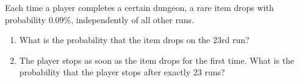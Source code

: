Each time a player completes a certain dungeon, a rare item drops with probability $0.09\%$, independently of all other runs.
\begin{enumerate}
\item[(a)] What is the probability that the item drops on the $23$rd run?
\item[(b)] The player stops as soon as the item drops for the first time. What is the probability that the player stops after exactly $23$ runs?
\end{enumerate}
